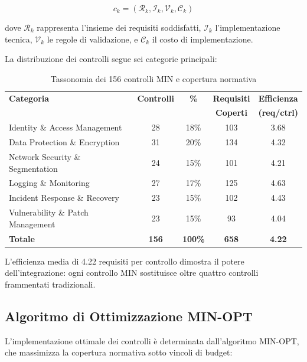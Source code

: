 \begin{equation}
c_k = (\mathcal{R}_k, \mathcal{I}_k, \mathcal{V}_k, \mathcal{C}_k)
\end{equation}

dove $\mathcal{R}_k$ rappresenta l'insieme dei requisiti soddisfatti, $\mathcal{I}_k$ l'implementazione tecnica, $\mathcal{V}_k$ le regole di validazione, e $\mathcal{C}_k$ il costo di implementazione.

La distribuzione dei controlli segue sei categorie principali:

\begin{table}[htbp]
\centering
\caption{Tassonomia dei 156 controlli MIN e copertura normativa}
\label{tab:min_taxonomy}
\begin{tabular}{lcccc}
\toprule
\textbf{Categoria} & \textbf{Controlli} & \textbf{\%} & \textbf{Requisiti} & \textbf{Efficienza} \\
& & & \textbf{Coperti} & \textbf{(req/ctrl)} \\
\midrule
Identity \& Access Management & 28 & 18\% & 103 & 3.68 \\
Data Protection \& Encryption & 31 & 20\% & 134 & 4.32 \\
Network Security \& Segmentation & 24 & 15\% & 101 & 4.21 \\
Logging \& Monitoring & 27 & 17\% & 125 & 4.63 \\
Incident Response \& Recovery & 23 & 15\% & 102 & 4.43 \\
Vulnerability \& Patch Management & 23 & 15\% & 93 & 4.04 \\
\midrule
\textbf{Totale} & \textbf{156} & \textbf{100\%} & \textbf{658} & \textbf{4.22} \\
\bottomrule
\end{tabular}
\end{table}

L'efficienza media di 4.22 requisiti per controllo dimostra il potere dell'integrazione: ogni controllo MIN sostituisce oltre quattro controlli frammentati tradizionali.

\subsection{\texorpdfstring{Algoritmo di Ottimizzazione MIN-OPT}{4.2.3 - Algoritmo MIN-OPT}}

L'implementazione ottimale dei controlli è determinata dall'algoritmo MIN-OPT, che massimizza la copertura normativa sotto vincoli di budget:

